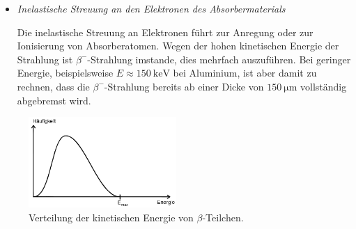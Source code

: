 \begin{itemize}
\item{\emph{Inelastische Streuung an den Elektronen des Absorbermaterials}}

Die inelastische Streuung an Elektronen führt zur Anregung oder zur Ionisierung von Absorberatomen.
Wegen der hohen kinetischen Energie der Strahlung ist $\beta^-$-Strahlung imstande, dies mehrfach auszuführen.
Bei geringer Energie, beispielsweise $E\approx\SI{150}{\kilo\electronvolt}$ bei Aluminium, ist aber damit zu rechnen, 
dass die $\beta^-$-Strahlung bereits ab einer Dicke von $\SI{150}{\micro\meter}$ vollständig abgebremst wird.
\end{itemize}


\begin{figure}[hbp]
	\centering
	\includegraphics[width=0.5\textwidth]{Bilder/beta.png}
	\caption{Verteilung der kinetischen Energie von \texorpdfstring{$\beta$}{Beta}-Teilchen.\cite{skript}}
	\label{fig:energieElektron}
\end{figure}

